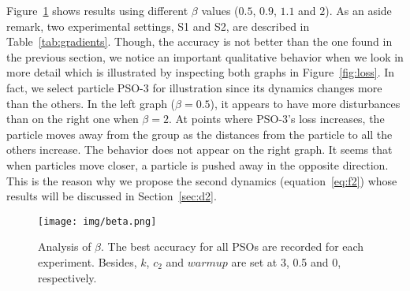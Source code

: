 \documentclass{ieeeaccess}
\begin{document}
Figure~\ref{fig:beta} shows results using different $\beta$ values ($0.5$, $0.9$, $1.1$ and $2$). As an aside remark, two experimental settings,  S1 and S2, are described in Table~\ref{tab:gradients}. Though, the accuracy is not better than the one found in the previous section, we notice an important qualitative behavior when we look in more detail which is illustrated by inspecting  both graphs in Figure~\ref{fig:loss}. In fact, we select particle PSO-3 for illustration since its dynamics changes more than the others. In the left graph ($\beta=0.5$), it appears to have more disturbances than on the right one when $\beta=2$. At points where PSO-3's loss increases, the particle moves away from the group as the distances from the particle to all the others increase. The behavior does not appear on the right graph. It seems that when particles move closer, a particle is pushed away in the opposite direction. This is the reason why we propose the second dynamics (equation~\eqref{eq:f2}) whose results will be discussed in Section~\ref{sec:d2}.
\begin{table}
\centering
\caption{Settings weight $M$}
\label{tab:gradients}
\end{table} \begin{figure}[htb!]
\begin{center}
\texttt{[image: img/beta.png]}
\caption{Analysis of $\beta$. The best accuracy for all PSOs are recorded for each experiment. Besides, $k$, $c_2$ and $warmup$ are set at 3, 0.5 and 0, respectively.}
\label{fig:beta}
\end{center}
\end{figure}
\end{document}
